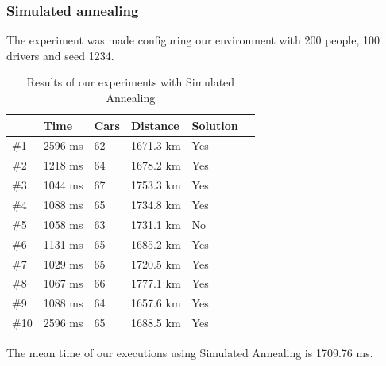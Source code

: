 \documentclass[12]{article}
\begin{document}
\subsubsection{Simulated annealing}
The experiment was made configuring our environment with 200 people, 100 drivers and seed 1234.
\\ 


\begin{table}[H]
\centering
\begin{tabular}{|l|l|l|l|l|l|}
\hline & \textbf{Time}  & \textbf{Cars} & \textbf{Distance} & \textbf{Solution}\\  \hline
 \#1 & 2596 ms  & 62 & 1671.3 km & Yes \\ \hline
 \#2 & 1218 ms & 64 & 1678.2 km & Yes \\ \hline
  \#3 & 1044 ms & 67 & 1753.3 km & Yes \\ \hline
 \#4 & 1088 ms & 65 & 1734.8 km & Yes \\ \hline
 \#5 & 1058 ms & 63 & 1731.1 km & No \\ \hline
 \#6 & 1131 ms & 65 & 1685.2 km & Yes \\ \hline
 \#7 & 1029 ms & 65 & 1720.5 km & Yes \\ \hline
 \#8 & 1067 ms & 66 & 1777.1 km & Yes \\ \hline
 \#9 & 1088 ms & 64 & 1657.6 km & Yes\\ \hline
 \#10 & 2596 ms & 65 & 1688.5 km & Yes \\ \hline

\end{tabular}
\caption{Results of our experiments with Simulated Annealing}
\label{Results2}
\end{table}

The mean time of our executions using Simulated Annealing is 1709.76 ms. 


\newpage
\end{document}

